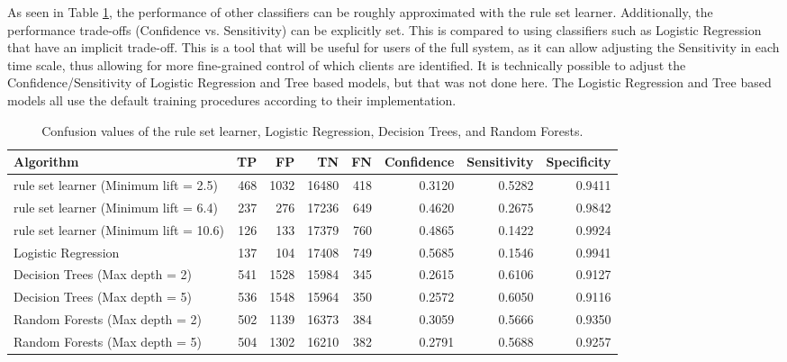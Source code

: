 As seen in Table \ref{tbl:results:30}, the performance of other classifiers can be roughly approximated with the \Abb rule set learner. Additionally, the performance trade-offs (Confidence vs. Sensitivity) can be explicitly set. This is compared to using classifiers such as Logistic Regression that have an implicit trade-off. This is a tool that will be useful for users of the full \Abb system, as it can allow adjusting the Sensitivity in each time scale, thus allowing for more fine-grained control of which clients are identified. It is technically possible to adjust the Confidence/Sensitivity of Logistic Regression and Tree based models, but that was not done here. The Logistic Regression and Tree based models all use the default training procedures according to their implementation.

\begin{table}[h]
	\centering

	\begin{tabular}{p{}rrrrrrr}
	\toprule
	{Algorithm} &    TP &     FP &      TN &    FN &  Confidence &  Sensitivity &  Specificity \\
	\midrule
	\Abb rule set learner (Minimum lift = 2.5) & 468 & 1032 & 16480 & 418 & 0.3120 & 0.5282 & 0.9411 \\
	\Abb rule set learner (Minimum lift = 6.4) & 237 & 276 & 17236 & 649 & 0.4620 & 0.2675 & 0.9842 \\
	\Abb rule set learner (Minimum lift = 10.6) & 126 & 133 & 17379 & 760 & 0.4865 & 0.1422 & 0.9924 \\
	Logistic Regression & 137 & 104 & 17408 & 749 & 0.5685 & 0.1546 & 0.9941 \\
	Decision Trees (Max depth = 2) & 541 & 1528 & 15984 & 345 & 0.2615 & 0.6106 & 0.9127 \\
	Decision Trees (Max depth = 5) & 536 & 1548 & 15964 & 350 & 0.2572 & 0.6050 & 0.9116 \\
	Random Forests (Max depth = 2) & 502 & 1139 & 16373 & 384 & 0.3059 & 0.5666 & 0.9350 \\
	Random Forests (Max depth = 5) & 504 & 1302 & 16210 & 382 & 0.2791 & 0.5688 & 0.9257 \\

	\bottomrule
	\end{tabular}

	\caption{Confusion values of the \Abb rule set learner, Logistic Regression, Decision Trees, and Random Forests.}
	\label{tbl:results:30}
\end{table}


